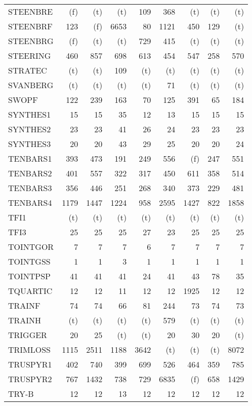 \documentclass[11pt,twoside]{article}
\begin{document}
{\begin{longtable}[c]{|l|r|r|r|r|r|r|r|r|}
 STEENBRE & (f) & (t) & (t) & 109 & 368 & (t) & (t) & (t) \\
 STEENBRF & 123 & (f) & 6653 & 80 & 1121 & 450 & 129 & (t) \\
 STEENBRG & (f) & (t) & (t) & 729 & 415 & (t) & (t) & (t) \\
 STEERING & 460 & 857 & 698 & 613 & 454 & 547 & 258 & 570 \\
 STRATEC & (t) & (t) & 109 & (t) & (t) & (t) & (t) & (t) \\
 SVANBERG & (t) & (t) & (t) & (t) & 71 & (t) & (t) & (t) \\
 SWOPF & 122 & 239 & 163 & 70 & 125 & 391 & 65 & 184 \\
 SYNTHES1 & 15 & 15 & 35 & 12 & 13 & 15 & 15 & 15 \\
 SYNTHES2 & 23 & 23 & 41 & 26 & 24 & 23 & 23 & 23 \\
 SYNTHES3 & 20 & 20 & 43 & 29 & 25 & 20 & 20 & 24 \\
 TENBARS1 & 393 & 473 & 191 & 249 & 556 & (f) & 247 & 551 \\
 TENBARS2 & 401 & 557 & 322 & 317 & 450 & 611 & 358 & 514 \\
 TENBARS3 & 356 & 446 & 251 & 268 & 340 & 373 & 229 & 481 \\
 TENBARS4 & 1179 & 1447 & 1224 & 958 & 2595 & 1427 & 822 & 1858 \\
 TFI1 & (t) & (t) & (t) & (t) & (t) & (t) & (t) & (t) \\
 TFI3 & 25 & 25 & 25 & 27 & 23 & 25 & 25 & 25 \\
 TOINTGOR & 7 & 7 & 7 & 6 & 7 & 7 & 7 & 7 \\
 TOINTGSS & 1 & 1 & 3 & 1 & 1 & 1 & 1 & 1 \\
 TOINTPSP & 41 & 41 & 41 & 24 & 41 & 43 & 78 & 35 \\
 TQUARTIC & 12 & 12 & 11 & 12 & 12 & 1925 & 12 & 12 \\
 TRAINF & 74 & 74 & 66 & 81 & 244 & 73 & 74 & 73 \\
 TRAINH & (t) & (t) & (t) & (t) & 579 & (t) & (t) & (t) \\
 TRIGGER & 20 & 25 & (t) & (t) & 20 & 30 & 20 & (t) \\
 TRIMLOSS & 1115 & 2511 & 1188 & 3642 & (t) & (t) & (t) & 8072 \\
 TRUSPYR1 & 402 & 740 & 399 & 699 & 526 & 464 & 359 & 785 \\
 TRUSPYR2 & 767 & 1432 & 738 & 729 & 6835 & (f) & 658 & 1429 \\
 TRY-B & 12 & 12 & 13 & 12 & 12 & 12 & 12 & 12 \\

\end{longtable}}
\end{document}
